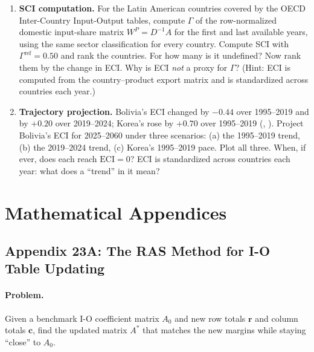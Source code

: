 \documentclass[../structural_economics_book.tex]{subfiles}
\begin{document}
\begin{enumerate}[label=\textbf{23.\arabic*}, leftmargin=3em]
\item \textbf{SCI computation.} For the Latin American countries covered by the OECD Inter-Country Input-Output tables, compute $\Gamma$ of the row-normalized domestic input-share matrix $W^P = D^{-1}A$ for the first and last available years, using the same sector classification for every country. Compute SCI with $\Gamma^{\text{ref}} = 0.50$ and rank the countries. For how many is it undefined? Now rank them by the change in ECI. Why is ECI \emph{not} a proxy for $\Gamma$? (Hint: ECI is computed from the country--product export matrix and is standardized across countries each year.)

\item \textbf{Trajectory projection.} Bolivia's ECI changed by $-0.44$ over 1995--2019 and by $+0.20$ over 2019--2024; Korea's rose by $+0.70$ over 1995--2019 (, ). Project Bolivia's ECI for 2025--2060 under three scenarios: (a) the 1995--2019 trend, (b) the 2019--2024 trend, (c) Korea's 1995--2019 pace. Plot all three. When, if ever, does each reach $\text{ECI} = 0$? ECI is standardized across countries each year: what does a ``trend'' in it mean?
\end{enumerate}


\newpage
\section*{Mathematical Appendices}


\subsection*{Appendix 23A: The RAS Method for I-O Table Updating}
\label{ch23:app:RAS}

\paragraph{Problem.} Given a benchmark I-O coefficient matrix $A_0$ and new row totals $\mathbf{r}$ and column totals $\mathbf{c}$, find the updated matrix $A^*$ that matches the new margins while staying ``close'' to $A_0$.
\end{document}
